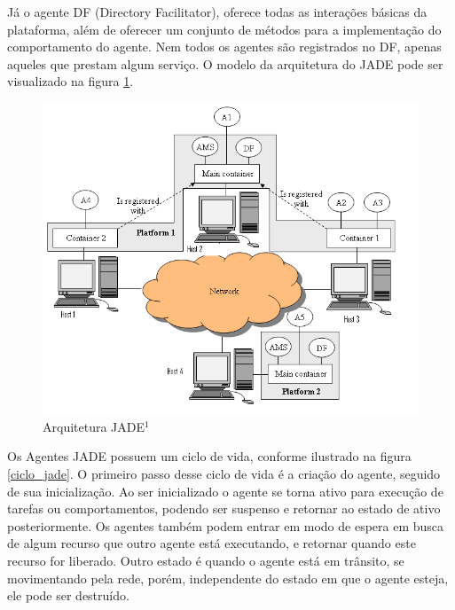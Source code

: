 Já o agente DF (Directory Facilitator), oferece todas as interações básicas da plataforma, além de oferecer um conjunto de métodos para a implementação do comportamento do agente. Nem todos os agentes são registrados no DF, apenas aqueles que prestam algum serviço. O modelo da arquitetura do JADE pode ser visualizado na figura \ref{jade}.

\begin{figure}[!htb]
\centering
\includegraphics[scale=0.5]{figuras/jade}
\caption{Arquitetura JADE$ ^{1} $}
\label{jade}
\end{figure}

Os Agentes JADE possuem um ciclo de vida, conforme ilustrado na figura \ref{ciclo_jade}. O primeiro passo desse ciclo de vida é a criação do agente, seguido de sua inicialização. Ao ser inicializado o agente se torna ativo para execução de tarefas ou comportamentos, podendo ser suspenso e retornar ao estado de ativo posteriormente. Os agentes também podem entrar em modo de espera em busca de algum recurso que outro agente está executando, e retornar quando este recurso for liberado. Outro estado é quando o agente está em trânsito, se movimentando pela rede, porém, independente do estado em que o agente esteja, ele pode ser destruído.

